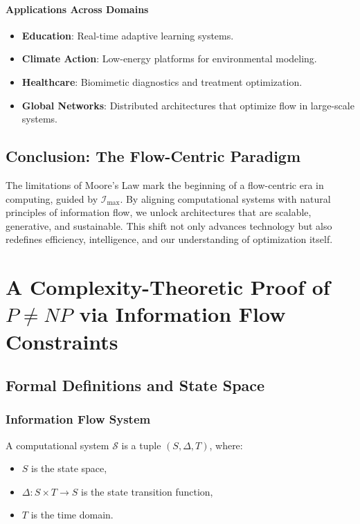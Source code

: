 \documentclass[12pt]{article}
\begin{document}
\paragraph{Applications Across Domains}
\begin{itemize}
    \item \textbf{Education}: Real-time adaptive learning systems.
    \item \textbf{Climate Action}: Low-energy platforms for environmental modeling.
    \item \textbf{Healthcare}: Biomimetic diagnostics and treatment optimization.
\item \textbf{Global Networks}: Distributed architectures that optimize flow in large-scale systems.
\end{itemize}


\subsection{Conclusion: The Flow-Centric Paradigm}

The limitations of Moore’s Law mark the beginning of a flow-centric era in computing, guided by \(\mathcal{I}_{\text{max}}\). By aligning computational systems with natural principles of information flow, we unlock architectures that are scalable, generative, and sustainable. This shift not only advances technology but also redefines efficiency, intelligence, and our understanding of optimization itself.


\section{A Complexity-Theoretic Proof of \(P \neq NP\) via Information Flow Constraints}

\subsection{Formal Definitions and State Space}

\subsubsection{Information Flow System}
A computational system \(\mathcal{S}\) is a tuple \((S, \Delta, T)\), where:
\begin{itemize}
    \item \(S\) is the state space,
    \item \(\Delta: S \times T \to S\) is the state transition function,
    \item \(T\) is the time domain.
\end{itemize}
\end{document}
